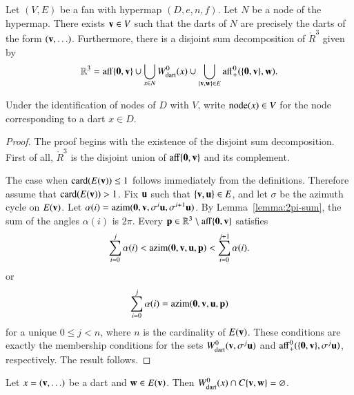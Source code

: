 

\begin{lemma}
Let $(V,E)$ be a fan with hypermap $(D,e,n,f)$.  Let $N$ be a node
of the hypermap.  There exists ${\mathbf v}\in V$ such that the darts of $N$
are precisely the darts of the form $({\mathbf v},\ldots)$.  Furthermore,
there is a disjoint sum decomposition of $\ring{R}^3$ given by
\begin{displaymath}
\mathbb{R}^3 = 
{\operatorname{aff}}\{{\mathbf 0},{\mathbf v}\} \cup
\bigcup_{x\in N} W^0_{\text{dart}}(x)  \cup 
\bigcup_{\{{\mathbf v},{\mathbf w}\}\in E} {\operatorname{aff}}_+^0(\{{\mathbf 0},{\mathbf v}\},{\mathbf w}).
\end{displaymath}
\end{lemma}
%
%
%

\begin{definition}[$\nd(x)$]
Under the identification of nodes of $D$ with $V$,
write ${\operatorname{node}}(x)\in V$ for the node corresponding to a dart $x\in D$. 
\end{definition}

\begin{proof}
The proof begins with the existence of the disjoint sum decomposition.
First of all, $\ring{R}^3$ is the disjoint union of ${\operatorname{aff}}\{{\mathbf 0},{\mathbf v}\}$
and its complement.

The case when ${\operatorname{card}}(E({\mathbf v}))\le 1$ follows immediately from the
definitions.  Therefore assume that ${\operatorname{card}}(E({\mathbf v})) >1$.  Fix ${\mathbf u}$ such
that $\{{\mathbf v},{\mathbf u}\}\in E$, and let $\sigma$ be the azimuth cycle on
$E({\mathbf v})$.  Let $\alpha(i)={\operatorname{azim}}({\mathbf 0},{\mathbf v},\sigma^i
{\mathbf u},\sigma^{i+1}{\mathbf u})$.  By Lemma~\ref{lemma:2pi-sum}, the sum of the
angles $\alpha(i)$ is $2\pi$.  Every
${\mathbf p}\in\mathbb{R}^3\setminus{\operatorname{aff}}\{{\mathbf 0},{\mathbf v}\}$ satisfies
\begin{displaymath}
\sum_{i=0}^j \alpha(i) <
{\operatorname{azim}}({\mathbf 0},{\mathbf v},{\mathbf u},{\mathbf p}) < \sum_{i=0}^{j+1} \alpha(i).
\end{displaymath}
or 
\begin{displaymath}
\sum_{i=0}^j \alpha(i) = {\operatorname{azim}}({\mathbf 0},{\mathbf v},{\mathbf u},{\mathbf p})
\end{displaymath}
for a unique $0 \le j < n$, where $n$ is the cardinality of $E({\mathbf v})$. 
These conditions are exactly the membership conditions for the sets
$
W^0_{\text{dart}}({\mathbf v},\sigma^j {\mathbf u})
$
and ${\operatorname{aff}}_+^0(\{{\mathbf 0},{\mathbf v}\},\sigma^j {\mathbf u})$, respectively.
The result follows.
\end{proof}

\begin{corollary}
Let $x = ({\mathbf v},\ldots)$ be a dart and ${\mathbf w}\in E({\mathbf v})$.
Then $W^0_{\text{dart}}(x)\cap C\{{\mathbf v},{\mathbf w}\}=\varnothing$.
\end{corollary}

